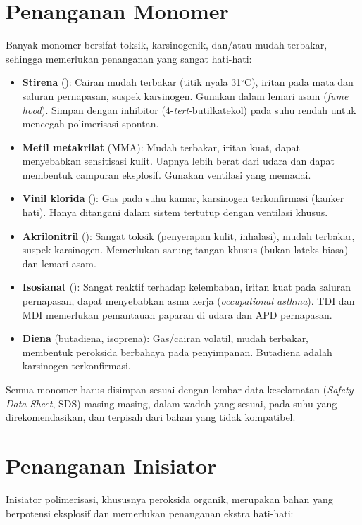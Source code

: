 \documentclass[12pt,a4paper,openany]{book}
\begin{document}
\section*{Penanganan Monomer}

Banyak monomer bersifat toksik, karsinogenik, dan/atau mudah terbakar, sehingga memerlukan penanganan yang sangat hati-hati:

\begin{itemize}
\item \textbf{Stirena} (): Cairan mudah terbakar (titik nyala 31$^{\circ}$C), iritan pada mata dan saluran pernapasan, suspek karsinogen. Gunakan dalam lemari asam (\textit{fume hood}). Simpan dengan inhibitor (4-\textit{tert}-butilkatekol) pada suhu rendah untuk mencegah polimerisasi spontan.
\item \textbf{Metil metakrilat} (MMA): Mudah terbakar, iritan kuat, dapat menyebabkan sensitisasi kulit. Uapnya lebih berat dari udara dan dapat membentuk campuran eksplosif. Gunakan ventilasi yang memadai.
\item \textbf{Vinil klorida} (): Gas pada suhu kamar, karsinogen terkonfirmasi (kanker hati). Hanya ditangani dalam sistem tertutup dengan ventilasi khusus.
\item \textbf{Akrilonitril} (): Sangat toksik (penyerapan kulit, inhalasi), mudah terbakar, suspek karsinogen. Memerlukan sarung tangan khusus (bukan lateks biasa) dan lemari asam.
\item \textbf{Isosianat} (): Sangat reaktif terhadap kelembaban, iritan kuat pada saluran pernapasan, dapat menyebabkan asma kerja (\textit{occupational asthma}). TDI dan MDI memerlukan pemantauan paparan di udara dan APD pernapasan.
\item \textbf{Diena} (butadiena, isoprena): Gas/cairan volatil, mudah terbakar, membentuk peroksida berbahaya pada penyimpanan. Butadiena adalah karsinogen terkonfirmasi.
\end{itemize}

Semua monomer harus disimpan sesuai dengan lembar data keselamatan (\textit{Safety Data Sheet}, SDS) masing-masing, dalam wadah yang sesuai, pada suhu yang direkomendasikan, dan terpisah dari bahan yang tidak kompatibel.

\section*{Penanganan Inisiator}

Inisiator polimerisasi, khususnya peroksida organik, merupakan bahan yang berpotensi eksplosif dan memerlukan penanganan ekstra hati-hati:
\end{document}
